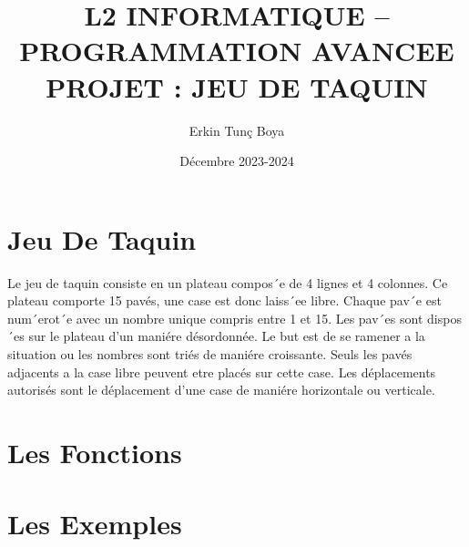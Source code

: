 \documentclass{article}
\title{L2 INFORMATIQUE – PROGRAMMATION AVANCEE \\ PROJET : JEU DE TAQUIN}
\author{Erkin Tunç Boya}
\date{Décembre 2023-2024}
\begin{document}
\maketitle
\tableofcontents
\newpage


\section{Jeu De Taquin}
Le jeu de taquin consiste en un
plateau compos´e de 4 lignes et 4 colonnes. Ce plateau comporte 15 pavés, une case est donc
laiss´ee libre. Chaque pav´e est num´erot´e avec un nombre unique compris entre 1 et 15.
Les pav´es sont dispos´es sur le plateau d’un maniére désordonnée. Le but est de se ramener a la
situation ou les nombres sont triés de maniére croissante. Seuls les pavés adjacents a la case libre
peuvent etre placés sur cette case. Les déplacements autorisés sont le déplacement d’une case de
maniére horizontale ou verticale.


\section{Les Fonctions}


\section{Les Exemples}
\end{document}
